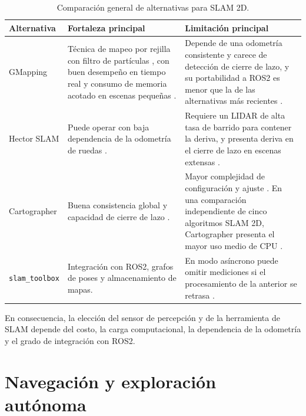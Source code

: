 \begin{table}[htbp]
\centering
\caption{Comparación general de alternativas para SLAM 2D.}
\label{tab:comparativa_slam}
\small
\begin{tabular}{P{2.4cm} P{5.3cm} P{5.9cm}}
\toprule
\textbf{Alternativa} &
\textbf{Fortaleza principal} &
\textbf{Limitación principal} \\
\midrule

GMapping & Técnica de mapeo por rejilla con filtro de partículas
\citep{grisetti2007gmapping}, con buen desempeño en tiempo real y consumo de
memoria acotado en escenas pequeñas \citep{ran2025review2dlidar}.
& Depende de una odometría consistente y carece de detección de cierre de lazo,
y su portabilidad a \gls{ROS2} es menor que la de las alternativas más recientes
\citep{ran2025review2dlidar,ngoc2023efficient,macenski2021slamtoolbox}. \\

Hector SLAM & Puede operar con baja dependencia de la odometría de ruedas
\citep{kohlbrecher2011hector}. & Requiere un \gls{LIDAR} de alta tasa de barrido
para contener la deriva, y presenta deriva en el cierre de lazo en escenas
extensas \citep{ran2025review2dlidar}. \\

Cartographer &
Buena consistencia global y capacidad de cierre de lazo
\citep{hess2016cartographer}. &
Mayor complejidad de configuración y ajuste
\citep{ngoc2023efficient,macenski2023desks}. En una comparación independiente de
cinco algoritmos SLAM 2D, Cartographer presenta el mayor uso medio de CPU
\citep{trejos2022slam}. \\

\texttt{slam\_toolbox} &
Integración con \gls{ROS2}, grafos de poses y almacenamiento de mapas. &
En modo asíncrono puede omitir mediciones si el procesamiento de la anterior se retrasa
\citep{macenski2021slamtoolbox}. \\

\bottomrule
\end{tabular}
\end{table}

En consecuencia, la elección del sensor de percepción y de la herramienta de
SLAM depende del costo, la carga computacional, la dependencia de la odometría
y el grado de integración con \gls{ROS2}.

\section{Navegación y exploración autónoma}
\label{sec:exploracion}

